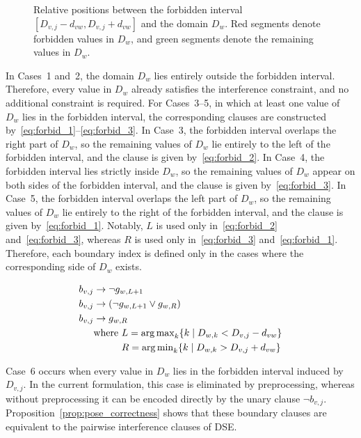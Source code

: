 \begin{figure}[]
{\begin{tikzpicture}
\end{tikzpicture}%
}
\caption{Relative positions between the forbidden interval $[D_{v,j}-d_{vw},D_{v,j}+d_{vw}]$ and the domain $D_w$. Red segments denote forbidden values in $D_w$, and green segments denote the remaining values in $D_w$.}
\label{fig:domain_pruning_cases}
\end{figure}

In Cases~1 and~2, the domain $D_w$ lies entirely outside the forbidden interval. Therefore, every value in $D_w$ already satisfies the interference constraint, and no additional constraint is required. 
For Cases~3--5, in which at least one value of $D_w$ lies in the forbidden interval, the corresponding clauses are constructed by~\eqref{eq:forbid_1}--\eqref{eq:forbid_3}.
In Case~3, the forbidden interval overlaps the right part of $D_w$, so the remaining values of $D_w$ lie entirely to the left of the forbidden interval, and the clause is given by~\eqref{eq:forbid_2}. In Case~4, the forbidden interval lies strictly inside $D_w$, so the remaining values of $D_w$ appear on both sides of the forbidden interval, and the clause is given by~\eqref{eq:forbid_3}. In Case~5, the forbidden interval overlaps the left part of $D_w$, so the remaining values of $D_w$ lie entirely to the right of the forbidden interval, and the clause is given by~\eqref{eq:forbid_1}. Notably, $L$ is used only in~\eqref{eq:forbid_2} and~\eqref{eq:forbid_3}, whereas $R$ is used only in~\eqref{eq:forbid_3} and~\eqref{eq:forbid_1}. Therefore, each boundary index is defined only in the cases where the corresponding side of $D_w$ exists.

\begin{align}
    b_{v,j} &\rightarrow \neg g_{w,L+1} \label{eq:forbid_2} \\
    b_{v,j} &\rightarrow (\neg g_{w,L+1} \lor g_{w,R}) \label{eq:forbid_3} \\
    b_{v,j} &\rightarrow g_{w,R} \label{eq:forbid_1} \\
    &\text{where } L = \operatorname{arg\,max}\limits_{k} \{ k \mid D_{w,k} < D_{v,j} - d_{vw} \} \notag \\
    &\phantom{\text{where }} R = \operatorname{arg\,min}\limits_{k} \{ k \mid D_{w,k} > D_{v,j} + d_{vw} \} \notag
\end{align}

Case~6 occurs when every value in $D_w$ lies in the forbidden interval induced by $D_{v,j}$. In the current formulation, this case is eliminated by preprocessing, whereas without preprocessing it can be encoded directly by the unary clause $\neg b_{v,j}$. Proposition~\ref{prop:pose_correctness} shows that these boundary clauses are equivalent to the pairwise interference clauses of DSE.

